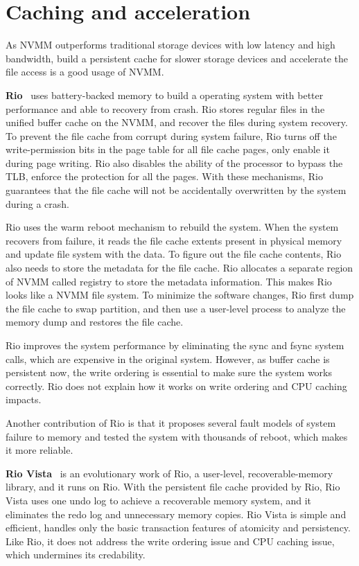 \section{Caching and acceleration} 
\label{sec:caching}

As NVMM outperforms traditional storage devices with low latency and high
bandwidth, build a persistent cache for slower storage devices and
accelerate the file access is a good usage of NVMM. 

\textbf{Rio}~\cite{riofilecache} uses battery-backed memory to build a
operating system
with better performance and able to recovery from crash. Rio stores regular
files in the unified buffer cache on the NVMM, and recover the files
during system recovery.
To prevent the file
cache from corrupt during system failure, Rio turns off the write-permission
bits in the page table for all file cache pages, only enable it during page
writing. Rio also disables the ability of the processor to bypass the TLB,
enforce the protection for all the pages. With these mechanisms, Rio guarantees
that the file cache will not be accidentally overwritten by the system during
a crash.

Rio uses the warm reboot mechanism to rebuild the system. When the system 
recovers from failure, it reads the file cache extents present in physical
memory
and update file system with the data. To figure out the file cache contents,
Rio also needs to store the metadata for the file cache. Rio allocates a
separate region of NVMM called registry to store the metadata information.
This makes Rio looks like a NVMM file system.
To minimize the software changes, Rio first dump the file cache to swap
partition, and then use a user-level process to analyze the memory dump
and restores the file cache.

Rio improves the system performance by eliminating the sync and fsync system
calls, which are expensive in the original system. However, as buffer cache
is persistent now, the write ordering is essential to make sure the system
works correctly. Rio does not explain how it works on write ordering and CPU
caching impacts.

Another contribution of Rio is that it proposes several fault models of system
failure to memory and tested the system with thousands of reboot, which makes
it more reliable.
 
\textbf{Rio Vista}~\cite{riovista} is an evolutionary work of Rio,
a user-level, recoverable-memory library, and it runs on Rio.
With the persistent file cache provided by Rio,
Rio Vista uses one undo log to achieve a recoverable memory system,
and it eliminates the redo log and unnecessary memory copies.
Rio Vista is simple and efficient, handles only the basic transaction features
of atomicity and persistency. Like Rio, it does not address the write ordering
issue and CPU caching issue, which undermines its credability. 

